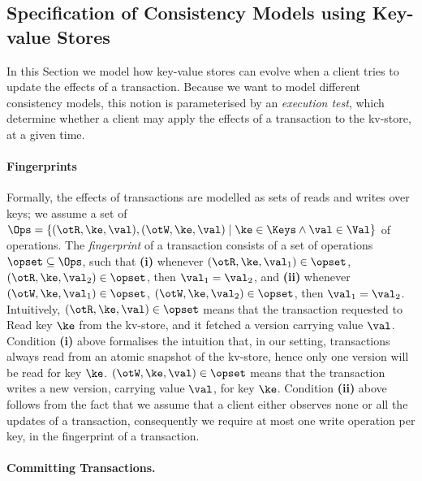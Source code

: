 \subsection{Specification of Consistency Models using Key-value Stores}
\label{sec:execution.tests}

In this Section we model how key-value stores can evolve when a client tries to update 
the effects of a transaction. Because we want to model different consistency models, 
this notion is parameterised by an \emph{execution test}, which determine whether 
a client may apply the effects of a transaction to the kv-store, at a given time.

\paragraph{Fingerprints} 
Formally, the effects of transactions are modelled as sets of reads and writes 
over keys; we assume a set of $\Ops = \{(\otR, \ke, \val), (\otW, \ke, \val) \mid \ke \in \Keys \wedge 
\val \in \Val \}$ of operations. The \emph{fingerprint} of a transaction consists of a 
set of operations $\opset \subseteq \Ops$, such that 
\textbf{(i)} whenever $(\otR, \ke, \val_1) \in \opset$, $(\otR, \ke, \val_2) \in \opset$, then $\val_1 = \val_2$, 
and \textbf{(ii)} whenever $(\otW, \ke, \val_1) \in \opset$, $(\otW, \ke, \val_2) \in \opset$, then $\val_1 = \val_2$. 
Intuitively, $(\otR, \ke, \val) \in \opset$ means that the transaction requested to \textsf{R}ead key $\ke$ from the kv-store, 
and it fetched a version carrying value $\val$. Condition \textbf{(i)} above formalises the intuition that, in our setting, 
transactions always read from an atomic snapshot of the kv-store, hence only one version will be read for key $\ke$. 
$(\otW, \ke, \val) \in \opset$ means that the transaction writes a new version, carrying value $\val$, for key $\ke$. 
Condition \textbf{(ii)} above follows from the fact that we assume that a client either observes none or all the updates 
of a transaction, consequently we require at most one write operation per key, in the fingerprint of a transaction. 

\paragraph{Committing Transactions.}

